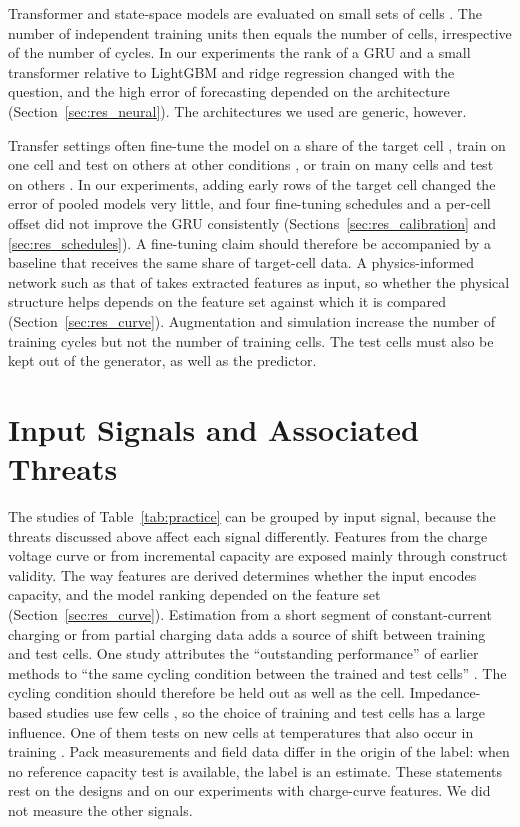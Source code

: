 \documentclass{ieeeaccess}
\begin{document}
Transformer and state-space models are evaluated on small sets of cells \cite{aud24,aud26}. The number of independent training units then equals the number of cells, irrespective of the number of cycles. In our experiments the rank of a GRU and a small transformer relative to LightGBM and ridge regression changed with the question, and the high error of forecasting depended on the architecture (Section~\ref{sec:res_neural}). The architectures we used are generic, however.

Transfer settings often fine-tune the model on a share of the target cell \cite{aud25,aud49}, train on one cell and test on others at other conditions \cite{aud31}, or train on many cells and test on others \cite{aud53}. In our experiments, adding early rows of the target cell changed the error of pooled models very little, and four fine-tuning schedules and a per-cell offset did not improve the GRU consistently (Sections~\ref{sec:res_calibration} and \ref{sec:res_schedules}). A fine-tuning claim should therefore be accompanied by a baseline that receives the same share of target-cell data. A physics-informed network such as that of \cite{wang2024} takes extracted features as input, so whether the physical structure helps depends on the feature set against which it is compared (Section~\ref{sec:res_curve}). Augmentation and simulation increase the number of training cycles \cite{aud21,aud29} but not the number of training cells. The test cells must also be kept out of the generator, as well as the predictor.

\section{Input Signals and Associated Threats}
\label{sec:signals}
The studies of Table~\ref{tab:practice} can be grouped by input signal, because the threats discussed above affect each signal differently. Features from the charge voltage curve or from incremental capacity \cite{aud17,aud12} are exposed mainly through construct validity. The way features are derived determines whether the input encodes capacity, and the model ranking depended on the feature set (Section~\ref{sec:res_curve}). Estimation from a short segment of constant-current charging \cite{aud31,aud54} or from partial charging data \cite{aud53} adds a source of shift between training and test cells. One study attributes the ``outstanding performance'' of earlier methods to ``the same cycling condition between the trained and test cells'' \cite{aud31}. The cycling condition should therefore be held out as well as the cell. Impedance-based studies use few cells \cite{aud42,aud46,aud52}, so the choice of training and test cells has a large influence. One of them tests on new cells at temperatures that also occur in training \cite{aud52}. Pack measurements \cite{aud37,aud57} and field data \cite{pozzato2023,zhao2026} differ in the origin of the label: when no reference capacity test is available, the label is an estimate. These statements rest on the designs and on our experiments with charge-curve features. We did not measure the other signals.
\end{document}
